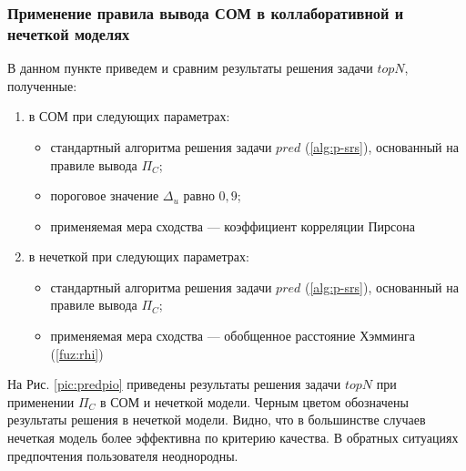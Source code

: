 \subsubsection{Применение правила вывода СОМ в коллаборативной и нечеткой
моделях}
В данном пункте приведем и сравним результаты решения задачи $topN$, полученные:
\begin{enumerate}
	\item  в СОМ при следующих параметрах:
		\begin{itemize}
			\item
			стандартный алгоритма решения задачи
			$pred$ (\ref{alg:p-srs}), основанный на
			правиле вывода $\Pi_C$;
			\item
			пороговое значение $\Delta_u$ равно $0,9$;
			\item
		применяемая мера сходства --- коэффициент корреляции Пирсона
		\end{itemize}
	\item в нечеткой при следующих параметрах:
		\begin{itemize}
			\item
			стандартный алгоритма решения задачи
			$pred$ (\ref{alg:p-srs}), основанный на
			правиле вывода $\Pi_C$;
			\item
				применяемая мера сходства --- обобщенное расстояние Хэмминга
				(\ref{fuz:rhi})
		\end{itemize}
\end{enumerate}

На Рис. \ref{pic:predpio} приведены результаты решения
задачи $topN$ при применении $\Pi_C$ в СОМ и нечеткой модели.
Черным цветом обозначены результаты решения в нечеткой модели.
Видно, что в большинстве случаев нечеткая модель более эффективна
по критерию качества. В обратных ситуациях предпочтения пользователя
неоднородны.

